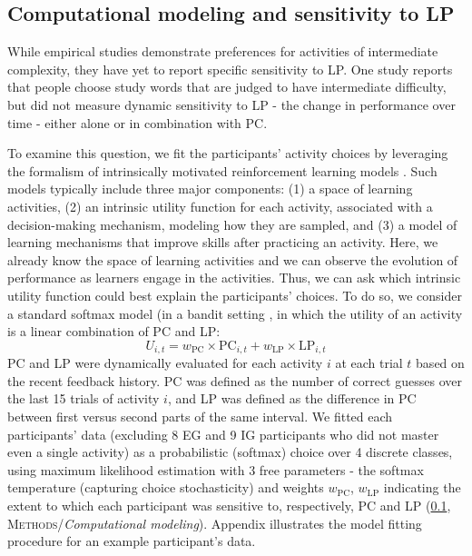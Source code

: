 \subsection{Computational modeling and sensitivity to LP}\label{CH4_SSS_computational_modeling}
While empirical studies demonstrate preferences for activities of intermediate complexity, they have yet to report specific sensitivity to \ac{LP}. One study \parencite{son_metacognitive_2000} reports that people choose study words that are judged to have intermediate difficulty, but did not measure dynamic sensitivity to \ac{LP} - the change in performance over time - either alone or in combination with \ac{PC}.

To examine this question, we fit the participants' activity choices by leveraging the formalism of intrinsically motivated reinforcement learning models \parencite{lopes_strategic_2012,graves_automated_2017,linke_adapting_2020,colas_curious_2019}. Such models typically include three major components: (1) a space of learning activities, (2) an intrinsic utility function for each activity, associated with a decision-making mechanism, modeling how they are sampled, and (3) a model of learning mechanisms that improve skills after practicing an activity. Here, we already know the space of learning activities and we can observe the evolution of performance as learners engage in the activities. Thus, we can ask which intrinsic utility function could best explain the participants' choices. To do so, we consider a standard softmax model (in a bandit setting \parencite{linke_adapting_2020}, in which the utility of an activity is a linear combination of \ac{PC} and \ac{LP}:
\begin{equation}
    U_{i,t} = w_{\mathrm{PC}} \times \mathrm{PC}_{i,t} +  w_{\mathrm{LP}} \times \mathrm{LP}_{i,t}
    \label{eq:utility}
\end{equation}
\ac{PC} and \ac{LP} were dynamically evaluated for each activity $i$ at each trial $t$ based on the recent feedback history. \ac{PC} was defined as the number of correct guesses over the last 15 trials of activity $i$, and \ac{LP} was defined as the difference in \ac{PC} between first versus second parts of the same interval. We fitted each participants’ data (excluding 8 \ac{EG} and 9 \ac{IG} participants who did not master even a single activity) as a probabilistic (softmax) choice over 4 discrete classes, using maximum likelihood estimation with 3 free parameters - the softmax temperature (capturing choice stochasticity) and weights $w_{\mathrm{PC}}$, $w_{\mathrm{LP}}$ indicating the extent to which each participant was sensitive to, respectively, \ac{PC} and \ac{LP} (\cref{CH4_SSS_computational_modeling}, \textsc{Methods}/\textit{Computational modeling}). Appendix  illustrates the model fitting procedure for an example participant's data.

